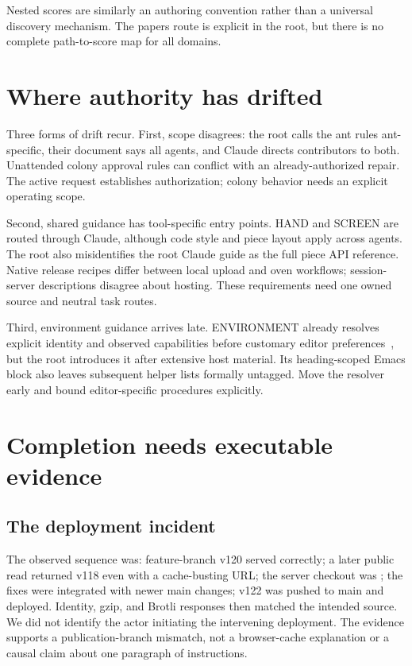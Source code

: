 \documentclass[10pt,letterpaper,twocolumn]{article}
\newcommand{\file}[1]{\texttt{\path{#1}}}
\begin{document}
Nested scores are similarly an authoring convention rather than a universal discovery mechanism. The papers route is explicit in the root, but there is no complete path-to-score map for all domains.



\section{Where authority has drifted}
Three forms of drift recur. First, scope disagrees: the root calls the ant rules ant-specific, their document says all agents, and Claude directs contributors to both. Unattended colony approval rules can conflict with an already-authorized repair. The active request establishes authorization; colony behavior needs an explicit operating scope.

Second, shared guidance has tool-specific entry points. HAND and SCREEN are routed through Claude, although code style and piece layout apply across agents. The root also misidentifies the root Claude guide as the full piece API reference. Native release recipes differ between local upload and oven workflows; session-server descriptions disagree about hosting. These requirements need one owned source and neutral task routes.

Third, environment guidance arrives late. ENVIRONMENT already resolves explicit identity and observed capabilities before customary editor preferences~\cite{environment}, but the root introduces it after extensive host material. Its heading-scoped Emacs block also leaves subsequent helper lists formally untagged. Move the resolver early and bound editor-specific procedures explicitly.

\section{Completion needs executable evidence}
\subsection{The deployment incident}
The observed sequence was: feature-branch v120 served correctly; a later public read returned v118 even with a cache-busting URL; the server checkout was \file{main}; the fixes were integrated with newer main changes; v122 was pushed to main and deployed. Identity, gzip, and Brotli responses then matched the intended source. We did not identify the actor initiating the intervening deployment. The evidence supports a publication-branch mismatch, not a browser-cache explanation or a causal claim about one paragraph of instructions.
\end{document}
